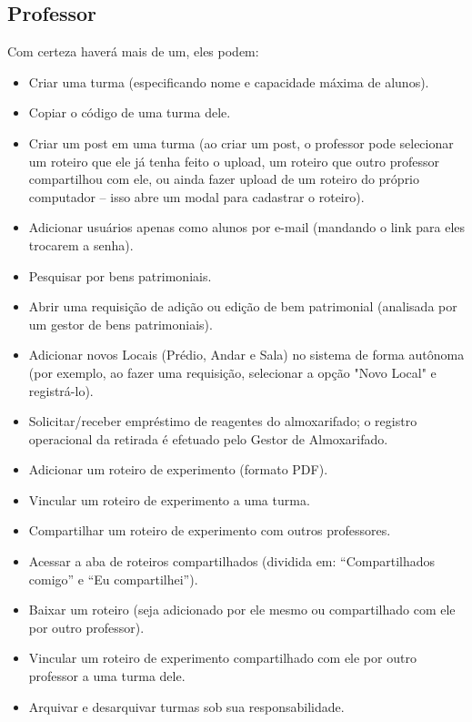 \documentclass[12pt,a4paper]{article}
\begin{document}
\subsection{Professor}
Com certeza haverá mais de um, eles podem:
\begin{itemize}
    \item Criar uma turma (especificando nome e capacidade máxima de alunos).
    \item Copiar o código de uma turma dele.
    \item Criar um post em uma turma (ao criar um post, o professor pode selecionar um roteiro que ele já tenha feito o upload, um roteiro que outro professor compartilhou com ele, ou ainda fazer upload de um roteiro do próprio computador -- isso abre um modal para cadastrar o roteiro).
    \item Adicionar usuários apenas como alunos por e-mail (mandando o link para eles trocarem a senha).
    \item Pesquisar por bens patrimoniais.
    \item Abrir uma requisição de adição ou edição de bem patrimonial (analisada por um gestor de bens patrimoniais).
    \item Adicionar novos Locais (Prédio, Andar e Sala) no sistema de forma autônoma (por exemplo, ao fazer uma requisição, selecionar a opção "Novo Local" e registrá-lo).
    \item Solicitar/receber empréstimo de reagentes do almoxarifado; o registro operacional da retirada é efetuado pelo Gestor de Almoxarifado.
    \item Adicionar um roteiro de experimento (formato PDF).
    \item Vincular um roteiro de experimento a uma turma.
    \item Compartilhar um roteiro de experimento com outros professores.
    \item Acessar a aba de roteiros compartilhados (dividida em: ``Compartilhados comigo'' e ``Eu compartilhei'').
    \item Baixar um roteiro (seja adicionado por ele mesmo ou compartilhado com ele por outro professor).
    \item Vincular um roteiro de experimento compartilhado com ele por outro professor a uma turma dele.
    \item Arquivar e desarquivar turmas sob sua responsabilidade.
\end{itemize}

\end{document}
